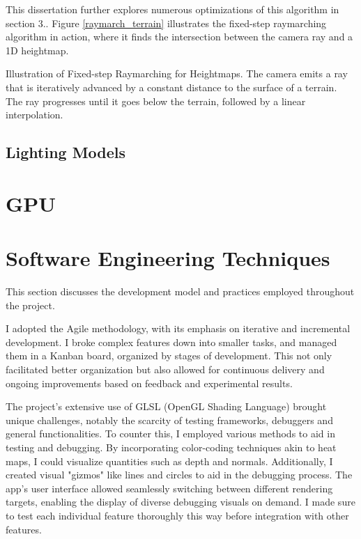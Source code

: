 This dissertation further explores numerous optimizations of this algorithm in section 3.\todo{}. Figure \ref{raymarch_terrain} illustrates the fixed-step raymarching algorithm in action, where it finds the intersection between the camera ray and a 1D heightmap.

{Illustration of Fixed-step Raymarching for Heightmaps. The camera emits a ray that is iteratively advanced by a constant distance to the surface of a terrain. The ray progresses until it goes below the terrain, followed by a linear interpolation.}


\subsection{Lighting Models}

\section{GPU}

\section{Software Engineering Techniques}
\label{sec:2.4}

This section discusses the development model and practices employed throughout the project.

I adopted the Agile methodology, with its emphasis on iterative and incremental development. I broke complex features down into smaller tasks, and managed them in a Kanban board, organized by stages of development. This not only facilitated better organization but also allowed for continuous delivery and ongoing improvements based on feedback and experimental results.

The project's extensive use of GLSL (OpenGL Shading Language) brought unique challenges, notably the scarcity of testing frameworks, debuggers and general functionalities. To counter this, I employed various methods to aid in testing and debugging. By incorporating color-coding techniques akin to heat maps, I could visualize quantities such as depth and normals. Additionally, I created visual "gizmos" like lines and circles to aid in the debugging process. The app's user interface allowed seamlessly switching between different rendering targets, enabling the display of diverse debugging visuals on demand. I made sure to test each individual feature thoroughly this way before integration with other features.

